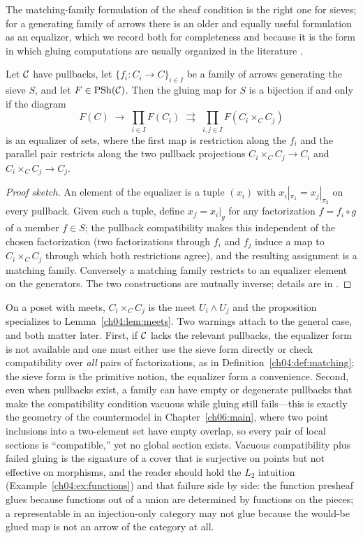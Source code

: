 The matching-family formulation of the sheaf condition is the right one for
sieves; for a generating family of arrows there is an older and equally
useful formulation as an equalizer, which we record both for completeness and
because it is the form in which gluing computations are usually organized in
the literature \cite{maclane,stacks00ZC}.

\begin{proposition}\label{ch04:prop:equalizer}
Let $\mathcal{C}$ have pullbacks, let $\{f_i:C_i\to C\}_{i\in I}$ be a family of
arrows generating the sieve $S$, and let $F\in\mathrm{PSh}(\mathcal{C})$. Then the gluing map
for $S$ is a bijection if and only if the diagram
\[
F(C)\;\longrightarrow\;\prod_{i\in I}F(C_i)
\;\rightrightarrows\;\prod_{i,j\in I}F(C_i\times_C C_j)
\]
is an equalizer of sets, where the first map is restriction along the $f_i$
and the parallel pair restricts along the two pullback projections
$C_i\times_C C_j\to C_i$ and $C_i\times_C C_j\to C_j$.
\end{proposition}

\begin{proof}[Proof sketch]
An element of the equalizer is a tuple $(x_i)$ with
$x_i|_{\pi_1}=x_j|_{\pi_2}$ on every pullback. Given such a tuple, define
$x_f=x_i|_g$ for any factorization $f=f_i\circ g$ of a member $f\in S$; the
pullback compatibility makes this independent of the chosen factorization
(two factorizations through $f_i$ and $f_j$ induce a map to
$C_i\times_C C_j$ through which both restrictions agree), and the resulting
assignment is a matching family. Conversely a matching family restricts to an
equalizer element on the generators. The two constructions are mutually
inverse; details are in \cite[Chap.~III]{maclane}.
\end{proof}

On a poset with meets, $C_i\times_C C_j$ is the meet $U_i\wedge U_j$ and the
proposition specializes to Lemma~\ref{ch04:lem:meets}. Two warnings attach to
the general case, and both matter later. First, if $\mathcal{C}$ lacks the relevant
pullbacks, the equalizer form is not available and one must either use the
sieve form directly or check compatibility over \emph{all} pairs of
factorizations, as in Definition~\ref{ch04:def:matching}; the sieve form is
the primitive notion, the equalizer form a convenience. Second, even when
pullbacks exist, a family can have empty or degenerate pullbacks that make
the compatibility condition vacuous while gluing still fails---this is
exactly the geometry of the countermodel in Chapter~\ref{ch06:main}, where
two point inclusions into a two-element set have empty overlap, so every pair
of local sections is ``compatible,'' yet no global section exists. Vacuous
compatibility plus failed gluing is the signature of a cover that is
surjective on points but not effective on morphisms, and the reader should
hold the $L_2$ intuition (Example~\ref{ch04:ex:functions}) and that failure
side by side: the function presheaf glues because functions out of a union
are determined by functions on the pieces; a representable in an
injection-only category may not glue because the would-be glued map is not an
arrow of the category at all.

